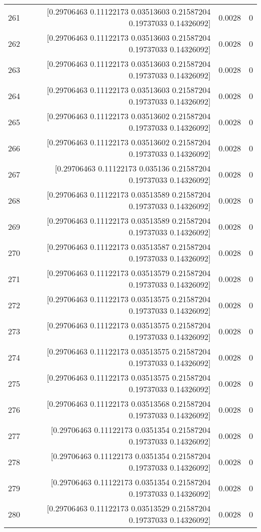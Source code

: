\begin{longtable}{lrrr}
261 & [0.29706463 0.11122173 0.03513603 0.21587204 0.19737033 0.14326092] & 0.0028 & 0 \\
262 & [0.29706463 0.11122173 0.03513603 0.21587204 0.19737033 0.14326092] & 0.0028 & 0 \\
263 & [0.29706463 0.11122173 0.03513603 0.21587204 0.19737033 0.14326092] & 0.0028 & 0 \\
264 & [0.29706463 0.11122173 0.03513603 0.21587204 0.19737033 0.14326092] & 0.0028 & 0 \\
265 & [0.29706463 0.11122173 0.03513602 0.21587204 0.19737033 0.14326092] & 0.0028 & 0 \\
266 & [0.29706463 0.11122173 0.03513602 0.21587204 0.19737033 0.14326092] & 0.0028 & 0 \\
267 & [0.29706463 0.11122173 0.035136   0.21587204 0.19737033 0.14326092] & 0.0028 & 0 \\
268 & [0.29706463 0.11122173 0.03513589 0.21587204 0.19737033 0.14326092] & 0.0028 & 0 \\
269 & [0.29706463 0.11122173 0.03513589 0.21587204 0.19737033 0.14326092] & 0.0028 & 0 \\
270 & [0.29706463 0.11122173 0.03513587 0.21587204 0.19737033 0.14326092] & 0.0028 & 0 \\
271 & [0.29706463 0.11122173 0.03513579 0.21587204 0.19737033 0.14326092] & 0.0028 & 0 \\
272 & [0.29706463 0.11122173 0.03513575 0.21587204 0.19737033 0.14326092] & 0.0028 & 0 \\
273 & [0.29706463 0.11122173 0.03513575 0.21587204 0.19737033 0.14326092] & 0.0028 & 0 \\
274 & [0.29706463 0.11122173 0.03513575 0.21587204 0.19737033 0.14326092] & 0.0028 & 0 \\
275 & [0.29706463 0.11122173 0.03513575 0.21587204 0.19737033 0.14326092] & 0.0028 & 0 \\
276 & [0.29706463 0.11122173 0.03513568 0.21587204 0.19737033 0.14326092] & 0.0028 & 0 \\
277 & [0.29706463 0.11122173 0.0351354  0.21587204 0.19737033 0.14326092] & 0.0028 & 0 \\
278 & [0.29706463 0.11122173 0.0351354  0.21587204 0.19737033 0.14326092] & 0.0028 & 0 \\
279 & [0.29706463 0.11122173 0.0351354  0.21587204 0.19737033 0.14326092] & 0.0028 & 0 \\
280 & [0.29706463 0.11122173 0.03513529 0.21587204 0.19737033 0.14326092] & 0.0028 & 0 \\

\end{longtable}
